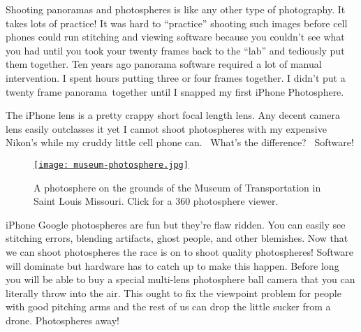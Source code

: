 


Shooting panoramas and photospheres is like any other type of
photography. It takes lots of practice! It was hard to ``practice''
shooting such images before cell phones could run stitching and viewing
software because you couldn't see what you had until you took your
twenty frames back to the ``lab'' and tediously put them together. Ten
years ago panorama software required a lot of manual intervention. I
spent hours putting three or four frames together. I didn't put a twenty
frame panorama~together until I snapped my first iPhone Photosphere.

The iPhone lens is a pretty crappy short focal length lens. Any decent
camera lens easily outclasses it yet I cannot shoot photospheres with my
expensive Nikon's while my cruddy little cell phone can.~ What's the
difference?~ Software!

\begin{figure}[htbp]
\centering
\href{https://www.google.com/maps/views/view/109459250977988268850/gphoto/6074254717471563618}{\texttt{[image: museum-photosphere.jpg]}}
\caption{A photosphere on the grounds of the Museum of Transportation in Saint Louis Missouri.
Click for a 360 photosphere viewer.}
\label{fig:4832X0}
\end{figure}





iPhone Google photospheres are fun but they're flaw ridden. You can
easily see stitching errors, blending artifacts, ghost people, and other
blemishes. Now that we can shoot photospheres the race is on to shoot
quality photospheres! Software will dominate but hardware has to catch
up to make this happen. Before long you will be able to buy a special
multi-lens photosphere ball camera that you can literally throw into the
air. This ought to fix the viewpoint problem for people with good
pitching arms and the rest of us can drop the little sucker from a
drone. Photospheres away!

